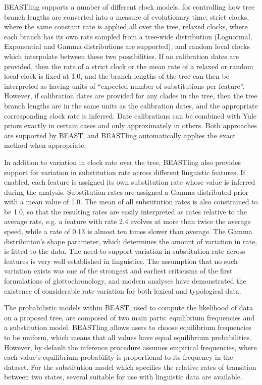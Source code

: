 \documentclass[twocolumn,10pt]{scrartcl}
\begin{document}
BEASTling supports a number of different clock models, for controlling how tree branch lengths are converted into a measure of evolutionary time; strict clocks, where the same constant rate is applied all over the tree, relaxed clocks\cite{Drummond2006}, where each branch has its own rate sampled from a tree-wide distribution (Lognormal, Exponential and Gamma distributions are supported), and random local clocks\cite{Drummond2010} which interpolate between these two possibilities.  If no calibration dates are provided, then the rate of a strict clock or the mean rate of a relaxed or random local clock is fixed at 1.0, and the branch lengths of the tree can then be interpreted as having units of ``expected number of substitutions per feature''.  However, if calibration dates are provided for any clades in the tree, then the tree branch lengths are in the same units as the calibration dates, and the appropriate corresponding clock rate is inferred.  Date calibrations can be combined with Yule priors exactly in certain cases\cite{Heled2011} and only approximately in others.  Both approaches are supported by BEAST, and BEASTling automatically applies the exact method when appropriate.

In addition to variation in clock rate over the tree, BEASTling also provides support for variation in substitution rate across different linguistic features.  If enabled, each feature is assigned its own substitution rate whose value is inferred during the analysis.  Substitution rates are assigned a Gamma-distributed prior with a mean value of 1.0.  The mean of all substitution rates is also constrained to be 1.0, so that the resulting rates are easily interpreted as rates relative to the average rate, e.g. a feature with rate 2.4 evolves at more than twice the average speed, while a rate of 0.13 is almost ten times slower than average.  The Gamma distribution's shape parameter, which determines the amount of variation in rate, is fitted to the data.  The need to support variation in substitution rate across features is very well established in linguistics.  The assumption that no such variation exists was one of the strongest and earliest criticisms of the first formulations of glottochronology, and modern analyses have demonstrated the existence of considerable rate variation for both lexical\cite{Pagel2007} and typological\cite{Greenhill2010,Dediu2011} data.

The probabilistic models within BEAST, used to compute the likelihood of data on a proposed tree, are composed of two main parts: equilibrium frequencies and a substitution model.  BEASTling allows users to choose equilibrium frequencies to be uniform, which means that all values have equal equilibrium probabilities. However, by default the inference procedure assumes empirical frequencies, where each value's equilibrium probability is proportional to its frequency in the dataset.  For the substitution model which specifies the relative rates of transition between two states, several suitable for use with linguistic data are available.
\end{document}

